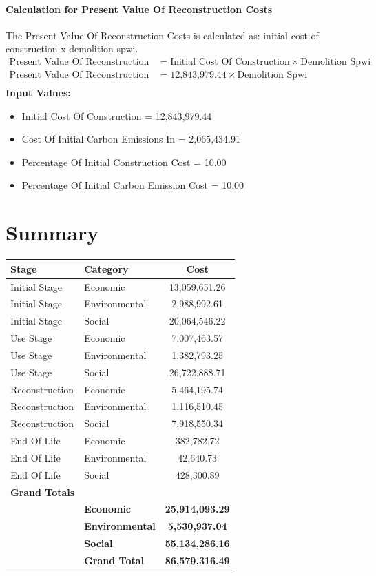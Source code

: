 \documentclass{article}
\begin{document}
 \paragraph{Calculation for Present Value Of Reconstruction Costs} 
The Present Value Of Reconstruction Costs is calculated as: initial cost of construction x demolition spwi.
\begin{align*}
 \text{Present Value Of Reconstruction Costs} &= \text{Initial Cost Of Construction} \times \text{Demolition Spwi} \\
 \text{Present Value Of Reconstruction Costs} &= \text{12,843,979.44} \times \text{Demolition Spwi} \\
\end{align*}
\textbf{Input Values:}
\begin{itemize}
\item Initial Cost Of Construction = 12,843,979.44
\item Cost Of Initial Carbon Emissions In = 2,065,434.91
\item Percentage Of Initial Construction Cost = 10.00
\item Percentage Of Initial Carbon Emission Cost = 10.00
\end{itemize}
\section{Summary}
\begin{longtable}{llc}
\toprule
\textbf{Stage} & \textbf{Category} & \textbf{Cost} \\
\midrule
Initial Stage & Economic & 13,059,651.26 \\
Initial Stage & Environmental & 2,988,992.61 \\
Initial Stage & Social & 20,064,546.22 \\
Use Stage & Economic & 7,007,463.57 \\
Use Stage & Environmental & 1,382,793.25 \\
Use Stage & Social & 26,722,888.71 \\
Reconstruction & Economic & 5,464,195.74 \\
Reconstruction & Environmental & 1,116,510.45 \\
Reconstruction & Social & 7,918,550.34 \\
End Of Life & Economic & 382,782.72 \\
End Of Life & Environmental & 42,640.73 \\
End Of Life & Social & 428,300.89 \\
\midrule
\textbf{Grand Totals} & & \\
\midrule
& \textbf{Economic} & \textbf{25,914,093.29} \\
& \textbf{Environmental} & \textbf{5,530,937.04} \\
& \textbf{Social} & \textbf{55,134,286.16} \\
\midrule
& \textbf{Grand Total} & \textbf{86,579,316.49} \\
\bottomrule
\end{longtable}
\end{document}
